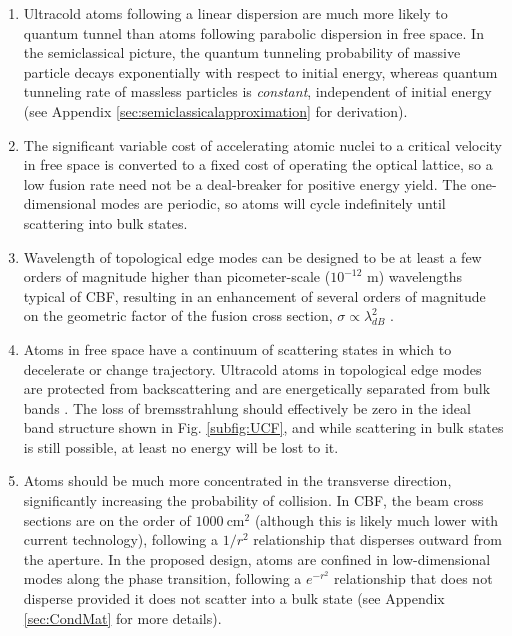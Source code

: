 \documentclass[onecolumn,
               superscriptaddress,
               floatfix,
               longbibliography, 
               showkeys,apl]{revtex4-2}
\begin{document}
\begin{enumerate}
  \item Ultracold atoms following a linear dispersion are much more likely to quantum tunnel than atoms following parabolic dispersion in free space. In the semiclassical picture, the quantum tunneling probability of massive particle decays exponentially with respect to initial energy, whereas quantum tunneling rate of massless particles is \textit{constant}, independent of initial energy (see Appendix \ref{sec:semiclassicalapproximation} for derivation).
  \item The significant variable cost of accelerating atomic nuclei to a critical velocity in free space is converted to a fixed cost of operating the optical lattice, so a low fusion rate need not be a deal-breaker for positive energy yield. The one-dimensional modes are periodic, so atoms will cycle indefinitely until scattering into bulk states.
  \item Wavelength of topological edge modes can be designed to be at least a few orders of magnitude higher than picometer-scale ($10^{-12}$ m) wavelengths typical of CBF, resulting in an enhancement of several orders of magnitude on the geometric factor of the fusion cross section, $\sigma \propto \lambda_{dB}^2$ \cite{LI20061517}.
  \item Atoms in free space have a continuum of scattering states in which to decelerate or change trajectory. Ultracold atoms in topological edge modes are protected from backscattering and are energetically separated from bulk bands \cite{RevModPhys.83.1057}. The loss of bremsstrahlung should effectively be zero in the ideal band structure shown in Fig. \ref{subfig:UCF}, and while scattering in bulk states is still possible, at least no energy will be lost to it. 
  \item Atoms should be much more concentrated in the transverse direction, significantly increasing the probability of collision. In CBF, the beam cross sections are on the order of $1000~\text{cm}^2$ \cite{blewett197xcbf} (although this is likely much lower with current technology), following a $1/r^2$ relationship \cite{blewett197xcbf} that disperses outward from the aperture. In the proposed design, atoms are confined in low-dimensional modes along the phase transition, following a $e^{-r^2}$ relationship that does not disperse provided it does not scatter into a bulk state (see Appendix \ref{sec:CondMat} for more details).
\end{enumerate}
\end{document}
